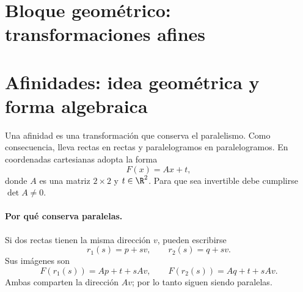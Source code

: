 \section{Bloque geométrico: transformaciones afines}\label{cap:10}

{\small\vspace{1mm}\par}


\section{Afinidades: idea geométrica y forma algebraica}\label{sec:afinidades-geom}

Una afinidad es una transformación que conserva el paralelismo. Como consecuencia, lleva
rectas en rectas y paralelogramos en paralelogramos. En coordenadas cartesianas adopta la forma
\[
  \boxed{F(x)=Ax+t},
\]
donde \(A\) es una matriz \(2\times2\) y \(t\in\R^2\). Para que sea invertible debe cumplirse
\(\det A\neq0\).

\begin{center}
\end{center}

\paragraph{Por qué conserva paralelas.}
Si dos rectas tienen la misma dirección \(v\), pueden escribirse
\[
  r_1(s)=p+sv,\qquad r_2(s)=q+sv.
\]
Sus imágenes son
\[
  F(r_1(s))=Ap+t+sAv,\qquad
  F(r_2(s))=Aq+t+sAv.
\]
Ambas comparten la dirección \(Av\); por lo tanto siguen siendo paralelas.

